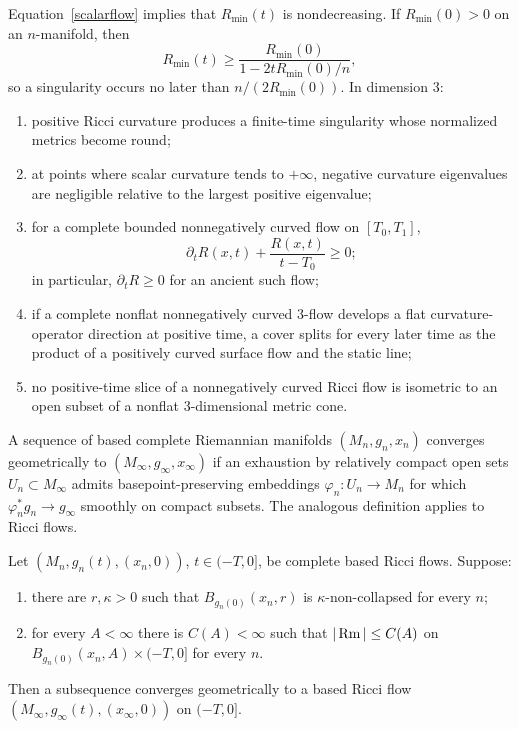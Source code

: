 Equation~\eqref{scalarflow} implies that $R_{\min}(t)$ is nondecreasing. If
$R_{\min}(0)>0$ on an $n$-manifold, then
\[
  R_{\min}(t)\geq
  \frac{R_{\min}(0)}{1-2tR_{\min}(0)/n},
\]
so a singularity occurs no later than $n/(2R_{\min}(0))$. In dimension $3$:
\begin{enumerate}
\item positive Ricci curvature produces a finite-time singularity whose
normalized metrics become round;
\item at points where scalar curvature tends to $+\infty$, negative curvature
eigenvalues are negligible relative to the largest positive eigenvalue;
\item for a complete bounded nonnegatively curved flow on $[T_0,T_1]$,
\[
  \partial_tR(x,t)+\frac{R(x,t)}{t-T_0}\geq0;
\]
in particular, $\partial_tR\geq0$ for an ancient such flow;
\item if a complete nonflat nonnegatively curved $3$-flow develops a flat
curvature-operator direction at positive time, a cover splits for every later
time as the product of a positively curved surface flow and the static line;
\item no positive-time slice of a nonnegatively curved Ricci flow is isometric
to an open subset of a nonflat $3$-dimensional metric cone.
\end{enumerate}

A sequence of based complete Riemannian manifolds
$(M_n,g_n,x_n)$ converges geometrically to
$(M_\infty,g_\infty,x_\infty)$ if an exhaustion by relatively compact open
sets $U_n\subset M_\infty$ admits basepoint-preserving embeddings
$\varphi_n:U_n\to M_n$ for which $\varphi_n^*g_n\to g_\infty$ smoothly on
compact subsets. The analogous definition applies to Ricci flows.

\begin{theorem}
\label{thm:compactness-based-ricci-flows}
Let $(M_n,g_n(t),(x_n,0))$, $t\in(-T,0]$, be complete based Ricci
flows. Suppose:
\begin{enumerate}
\item[(1)] there are $r,\kappa>0$ such that
$B_{g_n(0)}(x_n,r)$ is $\kappa$-non-collapsed for every $n$;
\item[(2)] for every $A<\infty$ there is $C(A)<\infty$ such that
$|\operatorname{Rm}|\leq C(A)$ on $B_{g_n(0)}(x_n,A)\times(-T,0]$ for every $n$.
\end{enumerate}
Then a subsequence converges geometrically to a based Ricci flow
$(M_\infty,g_\infty(t),(x_\infty,0))$ on $(-T,0]$.
\end{theorem}

